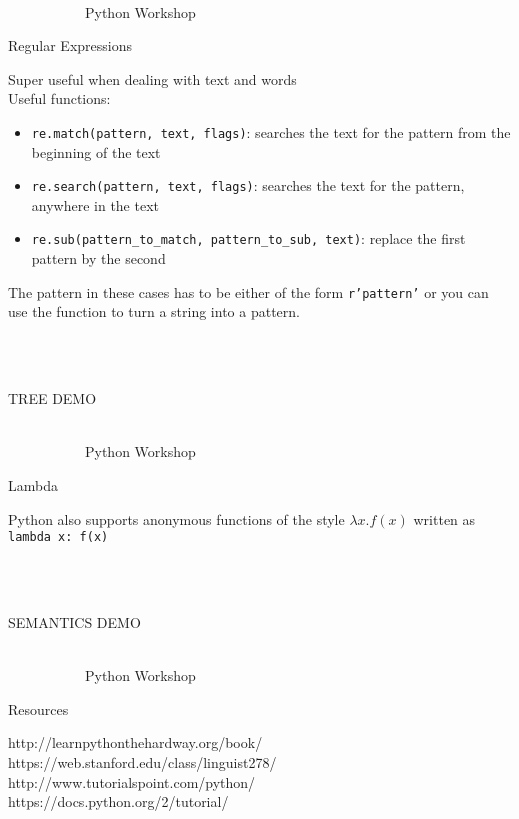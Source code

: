 \documentclass[10pt, xcolor=dvisnames]{beamer}
\begin{document}
\begin{frame}{{\tiny \ \\\vspace{-13pt} \ \ \ \ \ \ \ \ \ \ \ Python Workshop}\\ \centerline{Regular Expressions}}
\vspace*{-50pt}

Super useful when dealing with text and words\\

Useful functions:
\begin{itemize}
\item \texttt{re.match(pattern, text, flags)}: searches the text for the pattern from the beginning of the text
\item \texttt{re.search(pattern, text, flags)}: searches the text for the pattern, anywhere in the text
\item \texttt{re.sub(pattern\_to\_match, pattern\_to\_sub, text)}: replace the first pattern by the second
\end{itemize}

The pattern in these cases has to be either of the form \texttt{r'pattern'} or you can use the  function to turn a string into a pattern.


\ \\
\ \\
\centerline{TREE DEMO}


\end{frame}






\begin{frame}{{\tiny \ \\\vspace{-13pt} \ \ \ \ \ \ \ \ \ \ \ Python Workshop}\\ \centerline{Lambda}}
\vspace*{-50pt}

Python also supports anonymous functions of the style $\lambda x. f(x)$ written as \texttt{lambda x: f(x)}






\ \\
\ \\
\centerline{SEMANTICS DEMO}


\end{frame}





\begin{frame}{{\tiny \ \\\vspace{-13pt} \ \ \ \ \ \ \ \ \ \ \ Python Workshop}\\ \centerline{Resources}}
\vspace*{-50pt}

http://learnpythonthehardway.org/book/\\
https://web.stanford.edu/class/linguist278/\\
http://www.tutorialspoint.com/python/\\
https://docs.python.org/2/tutorial/



\end{frame}
\end{document}
